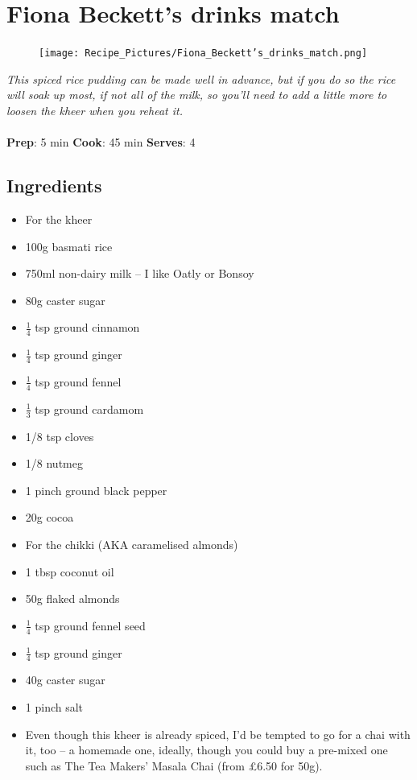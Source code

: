 \documentclass{book}
\begin{document}
\section{Fiona Beckett’s drinks match}
\begin{figure}
\centering\texttt{[image: Recipe\_Pictures/Fiona\_Beckett’s\_drinks\_match.png]}
\end{figure}
\emph{This spiced rice pudding can be made well in advance, but if you do so the rice will soak up most, if not all of the milk, so you’ll need to add a little more to loosen the kheer when you reheat it.}\\\\ 
\textbf{Prep}: 5 min
\textbf{Cook}: 45 min
\textbf{Serves}: 4
\subsection*{Ingredients}
\begin{itemize}
\item For the kheer
\item 100g basmati rice
\item 750ml non-dairy milk – I like Oatly or Bonsoy
\item 80g caster sugar
\item $\frac{1}{4}$ tsp ground cinnamon
\item $\frac{1}{4}$ tsp ground ginger
\item $\frac{1}{4}$ tsp ground fennel
\item $\frac{1}{3}$ tsp ground cardamom
\item 1/8 tsp cloves
\item 1/8 nutmeg
\item 1 pinch ground black pepper
\item 20g cocoa
\end{itemize}

\begin{itemize}
\item For the chikki (AKA caramelised almonds)
\item 1 tbsp coconut oil
\item 50g flaked almonds
\item $\frac{1}{4}$ tsp ground fennel seed
\item $\frac{1}{4}$ tsp ground ginger
\item 40g caster sugar
\item 1 pinch salt
\end{itemize}

\begin{itemize}
\item  Even though this kheer is already spiced, I’d be tempted to go for a chai with it, too – a homemade one, ideally, though you could buy a pre-mixed one such as The Tea Makers’ Masala Chai (from £6.50 for 50g).
\end{itemize}
\end{document}
